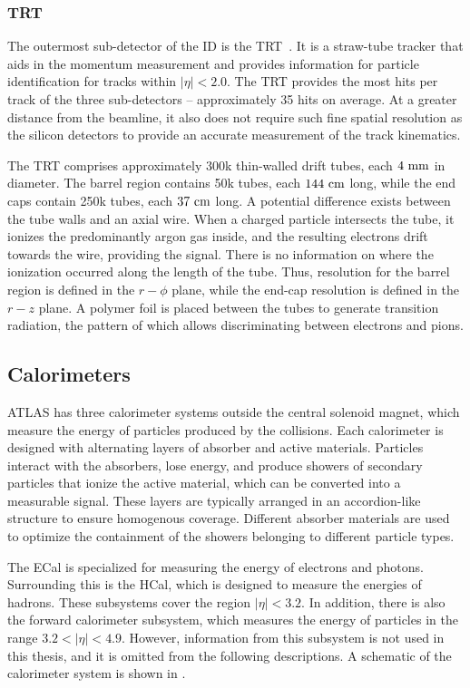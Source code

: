 \subsubsection{TRT}

The outermost sub-detector of the \Gls{ID} is the \Gls{TRT}~\cite{ATLASTRT}.
It is a straw-tube tracker that aids in the momentum measurement and provides information for particle identification for tracks within $|\eta| < 2.0$.
The \Gls{TRT} provides the most hits per track of the three sub-detectors -- approximately 35 hits on average.
At a greater distance from the beamline, it also does not require such fine spatial resolution as the silicon detectors to provide an accurate measurement of the track kinematics.

The \Gls{TRT} comprises approximately 300k thin-walled drift tubes, each $4~\mm$ in diameter.
The barrel region contains 50k tubes, each $144~\cm$ long, while the end caps contain 250k tubes, each $37~\cm$ long.
A potential difference exists between the tube walls and an axial wire.
When a charged particle intersects the tube, it ionizes the predominantly argon gas inside, and the resulting electrons drift towards the wire, providing the signal.
There is no information on where the ionization occurred along the length of the tube.
Thus, resolution for the barrel region is defined in the $r-\phi$ plane, while the end-cap resolution is defined in the $r-z$ plane.
A polymer foil is placed between the tubes to generate transition radiation, the pattern of which allows discriminating between electrons and pions.

\subsection{Calorimeters}

ATLAS has three calorimeter systems outside the central solenoid magnet, which measure the energy of particles produced by the collisions.
Each calorimeter is designed with alternating layers of absorber and active materials.
Particles interact with the absorbers, lose energy, and produce showers of secondary particles that ionize the active material, which can be converted into a measurable signal.
These layers are typically arranged in an accordion-like structure to ensure homogenous coverage.
Different absorber materials are used to optimize the containment of the showers belonging to different particle types.

The \Gls{ECal} is specialized for measuring the energy of electrons and photons.
Surrounding this is the \Gls{HCal}, which is designed to measure the energies of hadrons.
These subsystems cover the region $|\eta| < 3.2$.
In addition, there is also the forward calorimeter subsystem, which measures the energy of particles in the range $3.2 < |\eta| < 4.9$.
However, information from this subsystem is not used in this thesis, and it is omitted from the following descriptions.
A schematic of the calorimeter system is shown in .

